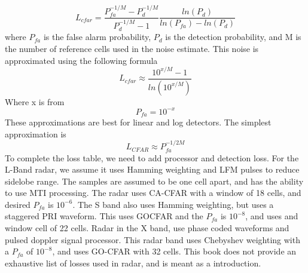 \documentclass[12pt]{article}
\begin{document}
\begin{equation}
    L_{cfar} = \frac{P_{fa}^{-1/M}-P_d^{-1/M}}{P_d^{-1/M}-1} \frac{ln(P_d)}{ ln(P_{fa})-ln(P_d) }
\end{equation}
where $P_{fa}$ is the false alarm probability, $P_d$ is the detection probability, and M is the number of reference cells used in the noise estimate. This noise is approximated using the following formula
\begin{equation}
    L_{cfar} \approx \frac{10^{x/M}-1}{ln(10^{x/M}) }
\end{equation}
Where x is from
\begin{equation}
    P_{fa} = 10^{-x}
\end{equation}
These approximations are best for linear and log detectors. The simplest approximation is 
\begin{equation}
    L_{CFAR} \approx P_{fa}^{-1/2M}
\end{equation}
To complete the loss table, we need to add processor and detection loss. For the L-Band radar, we assume it uses Hamming weighting and LFM pulses to reduce sidelobe range. The samples are assumed to be one cell apart, and has the ability to use MTI processing. The radar uses CA-CFAR with a window of 18 cells, and desired $P_{fa}$ is $10^{-6}$. The S band also uses Hamming weighting, but uses a staggered PRI waveform. This uses GOCFAR and the $P_{fa}$ is $10^{-8}$, and uses and window cell of 22 cells. Radar in the X band, use phase coded waveforms and pulsed doppler signal processor. This radar band uses Chebyshev weighting with a $P_{fa}$ of $10^{-8}$, and uses GO-CFAR with 32 cells. This book does not provide an exhaustive list of losses used in radar, and is meant as a introduction. 

\end{document}
